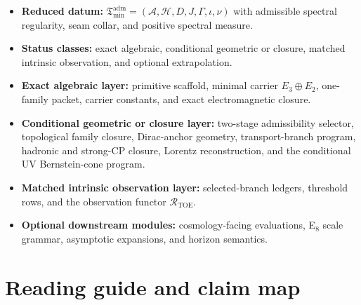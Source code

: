 \documentclass[11pt,a4paper]{article}
\theoremstyle{definition}
\theoremstyle{remark}
\newcommand{\inv}{\iota}
\newcommand{\Tmin}{\mathfrak T_{\mathrm{min}}}
\begin{document}
\begin{tcolorbox}[colback=tfptblue!2, colframe=tfptblue!40, breakable,
    title={Reading Status for the Present Paper}, colbacktitle=tfptblue!60]
\begin{itemize}[leftmargin=1.5em, topsep=3pt, itemsep=3pt]
    \item \textbf{Reduced datum:} $\Tmin^{\mathrm{adm}}=(\mathcal A,\mathcal H,D,J,\Gamma,\inv,\nu)$ with admissible spectral regularity, seam collar, and positive spectral measure.
    \item \textbf{Status classes:} exact algebraic, conditional geometric or closure, matched intrinsic observation, and optional extrapolation.
    \item \textbf{Exact algebraic layer:} primitive scaffold, minimal carrier $E_3\oplus E_2$, one-family packet, carrier constants, and exact electromagnetic closure.
    \item \textbf{Conditional geometric or closure layer:} two-stage admissibility selector, topological family closure, Dirac-anchor geometry, transport-branch program, hadronic and strong-CP closure, Lorentz reconstruction, and the conditional UV Bernstein-cone program.
    \item \textbf{Matched intrinsic observation layer:} selected-branch ledgers, threshold rows, and the observation functor $\mathcal R_{\mathrm{TOE}}$.
    \item \textbf{Optional downstream modules:} cosmology-facing evaluations, E$_8$ scale grammar, asymptotic expansions, and horizon semantics.
\end{itemize}
\end{tcolorbox}

\tableofcontents

\section{Reading guide and claim map}
\end{document}
